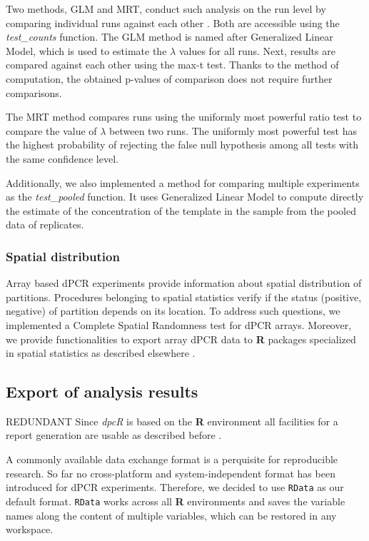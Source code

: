 \documentclass[a4,center,fleqn]{NAR}
\begin{document}
Two methods, GLM and MRT, conduct such analysis on the run level by comparing 
individual runs against each other \cite{Burdukiewicz_tba}. Both are accessible 
using the \textit{test\_counts} function. The GLM method is named after 
Generalized Linear Model, which is used to estimate the $\lambda$ values for all 
runs. Next, results are compared against each other using the max-t test. Thanks 
to the method of computation, the obtained p-values of comparison does not 
require further comparisons.

The MRT method compares runs using the uniformly most powerful ratio test to 
compare the value of $\lambda$ between two runs. The uniformly most powerful 
test has the highest probability of rejecting the false null hypothesis among 
all tests with the same confidence level. 

Additionally, we also implemented a method for comparing multiple experiments 
\cite{dorazio_statistical_2015} as the \textit{test\_pooled} function. It uses 
Generalized Linear Model to compute directly the estimate of the concentration 
of the template in the sample from the pooled data of replicates. 

\subsubsection{Spatial distribution}

Array based dPCR experiments provide information about spatial distribution of 
partitions. Procedures belonging to spatial statistics verify if the status 
(positive, negative) of partition depends on its location. To address such 
questions, we implemented a Complete Spatial Randomness test for dPCR arrays. 
Moreover, we provide functionalities to export array dPCR data to \textbf{R} 
packages specialized in spatial statistics as described elsewhere 
\cite{Baddeley_2015}.


\subsection{Export of analysis results}
REDUNDANT
Since \textit{dpcR} is based on the \textbf{R} environment all facilities for a 
report generation are usable as described before \cite{rodiger_r_2015}.

A commonly available data exchange format is a perquisite for reproducible 
research. So far no cross-platform and system-independent format has been 
introduced for dPCR experiments. Therefore, we decided to use \texttt{RData} as 
our default format. \texttt{RData} works across all \textbf{R} environments and 
saves the variable names along the content of multiple variables, which can be 
restored in any workspace.
\end{document}
